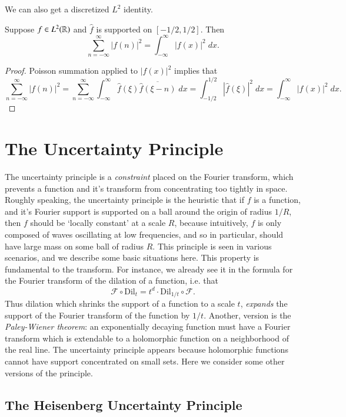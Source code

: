 We can also get a discretized $L^2$ identity.

\begin{theorem}
    Suppose $f \in L^2(\operatorname{\mathbb{R}})$ and $\widehat{f}$ is supported on $[-1/2,1/2]$. Then
    \[ \sum_{n = -\infty}^\infty |f(n)|^2 = \int_{-\infty}^\infty |f(x)|^2\; dx. \]
\end{theorem}
\begin{proof}
    Poisson summation applied to $|f(x)|^2$ implies that
    \[ \sum_{n = -\infty}^\infty |f(n)|^2 = \sum_{n = -\infty}^\infty \int_{-\infty}^\infty \widehat{f}(\xi) \overline{\widehat{f}(\xi - n)}\; dx = \int_{-1/2}^{1/2} |\widehat{f}(\xi)|^2\; dx = \int_{-\infty}^\infty |f(x)|^2\; dx. \]
\end{proof}






\section{The Uncertainty Principle}

The uncertainty principle is a \emph{constraint} placed on the Fourier transform, which prevents a function and it's transform from concentrating too tightly in space. Roughly speaking, the uncertainty principle is the heuristic that if $f$ is a function, and it's Fourier support is supported on a ball around the origin of radius $1/R$, then $f$ should be `locally constant' at a scale $R$, because intuitively, $f$ is only composed of waves oscillating at low frequencies, and so in particular, should have large mass on some ball of radius $R$. This principle is seen in various scenarios, and we describe some basic situations here. This property is fundamental to the transform. For instance, we already see it in the formula for the Fourier transform of the dilation of a function, i.e. that
%
\[ \mathcal{F} \circ \text{Dil}_t = t^d \cdot \text{Dil}_{1/t} \circ \mathcal{F}. \]
%
Thus dilation which shrinks the support of a function to a scale $t$, \emph{expands} the support of the Fourier transform of the function by $1/t$. Another, version is the \emph{Paley-Wiener theorem}: an exponentially decaying function must have a Fourier transform which is extendable to a holomorphic function on a neighborhood of the real line. The uncertainty principle appears because holomorphic functions cannot have support concentrated on small sets. Here we consider some other versions of the principle.

\subsection{The Heisenberg Uncertainty Principle}

